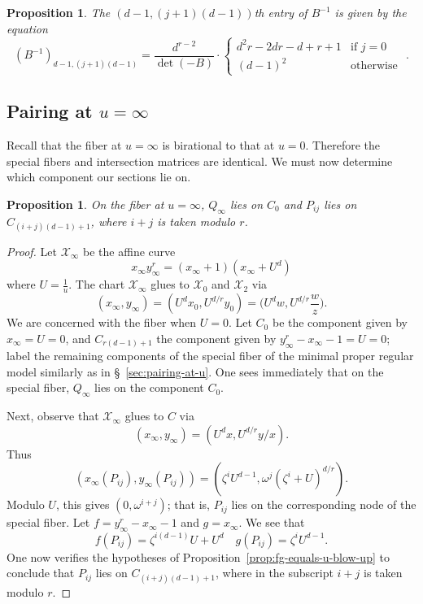 \documentclass[reqno]{amsart}
\newtheorem{proposition}[thm]{Proposition}
\theoremstyle{definition}
\theoremstyle{remark}
\def\XX{\mathcal{X}}
\newcommand{\sxi}{\mathcal{X}_\infty}
\begin{document}
\begin{proposition}
The $(d-1, (j+1)(d-1))$th entry of $B^{-1}$ is given by the equation
\[
(B^{-1})_{d-1,(j+1)(d-1)} = \frac{d^{r-2}}{\det(-B)} \cdot \begin{cases}
    d^2r-2dr-d+r+1 & \text{if } j=0 \\
    (d-1)^2 & \text{otherwise }
  \end{cases}.
\]
\end{proposition}

\subsection{Pairing at $u=\infty$}
\label{sec:pairing-at-u=infty}

Recall that the fiber at $u=\infty$ is birational to that at $u=0$. Therefore the special fibers and intersection matrices are identical. We must now determine which component our sections lie on.
\begin{proposition}
  On the fiber at $u=\infty$, $Q_\infty$ lies on $C_0$ and $P_{ij}$ lies on $C_{(i+j)(d-1) +1}$, where $i+j$ is taken modulo $r$.
\end{proposition}

\begin{proof}
  Let $\sxi$ be the affine curve
  \[
  x_\infty y_\infty^r = (x_\infty + 1)(x_\infty + {U^d})
  \]
  where $U = \frac{1}{u}$. The chart $\sxi$ glues to $\XX_0$ and $\XX_2$ via 
  \[
  (x_\infty, y_\infty) = (U^d x_0, U^{d/r} y_0) = \bigg(U^d w, U^{d/r} \frac{w}{z}\bigg).
  \]
  We are concerned with the fiber when $U = 0$. Let $C_0$ be the component given by $x_\infty = U = 0$, and $C_{r(d-1)+1}$ the component given by $y_\infty^r - x_\infty - 1 = U = 0$; label the remaining components of the special fiber of the minimal proper regular model similarly as in \S~\ref{sec:pairing-at-u}. One sees immediately that on the special fiber, $Q_\infty$ lies on the component $C_0$.

  Next, observe that $\sxi$ glues to $C$ via
  \[
  (x_\infty, y_\infty) = (U^d x, U^{d/r} y/x).
  \]
  Thus
  \[
  (x_\infty(P_{ij}), y_\infty(P_{ij})) = (\zeta^i U^{d-1}, \omega^j (\zeta^i + U)^{d/r}).
  \]
  Modulo $U$, this gives $(0,\omega^{i+j})$; that is, $P_{ij}$ lies on the corresponding node of the special fiber. Let $f = y_\infty^r - x_\infty - 1$ and $g = x_\infty$. We see that 
  \[
  f(P_{ij}) = \zeta^{i(d-1)} U + U^d \quad g(P_{ij}) = \zeta^i U^{d-1}.
  \]
  One now verifies the hypotheses of Proposition~\ref{prop:fg-equals-u-blow-up} to conclude that $P_{ij}$ lies on $C_{(i+j)(d-1) +1}$, where in the subscript $i+j$ is taken modulo $r$.
\end{proof}
\end{document}
